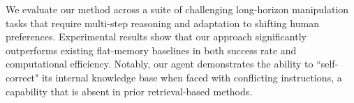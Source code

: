 

We evaluate our method across a suite of challenging long-horizon manipulation tasks that require multi-step reasoning and adaptation to shifting human preferences. Experimental results show that our approach significantly outperforms existing flat-memory baselines in both success rate and computational efficiency. Notably, our agent demonstrates the ability to ``self-correct" its internal knowledge base when faced with conflicting instructions, a capability that is absent in prior retrieval-based methods.


